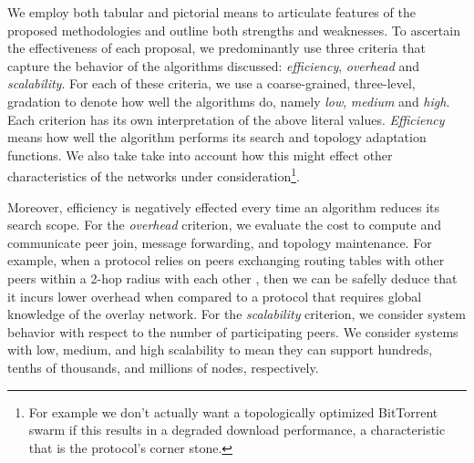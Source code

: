 We employ both tabular and pictorial means to 
articulate features of the proposed methodologies and outline
both strengths and weaknesses.
To ascertain the effectiveness of each proposal, we predominantly use 
three criteria that capture the behavior of the algorithms 
discussed:
\emph{efficiency}, \emph{overhead} and \emph{scalability}.
For each of these criteria, we use a coarse-grained,
three-level, gradation to denote how well the algorithms do,
namely \emph{low}, \emph{medium} and \emph{high}.
Each criterion has its own
interpretation of the above literal values. 
\emph{Efficiency} means how well the
algorithm performs its search and topology adaptation functions. We also take
take into account how this might effect other characteristics of the networks
under consideration\footnote{For example we don't actually want a topologically
optimized BitTorrent swarm if this results in a degraded download performance,
a characteristic that is the protocol's corner stone.}.


Moreover, efficiency is negatively effected every time an algorithm
reduces its search scope.
For the \emph{overhead} criterion, we evaluate the cost
to compute and communicate peer join, message forwarding, 
and topology maintenance. For example, when a protocol relies on peers
exchanging routing tables with other peers within a 2-hop radius with each other
, then we can be safelly deduce that it incurs lower overhead when compared to a
protocol that requires global knowledge of the overlay network.
For the \emph{scalability} criterion, we consider system behavior 
with respect to the number of participating peers. 
We consider systems with low, medium, and high scalability 
to mean they can support hundreds, tenths of thousands, 
and millions of nodes, respectively. 
